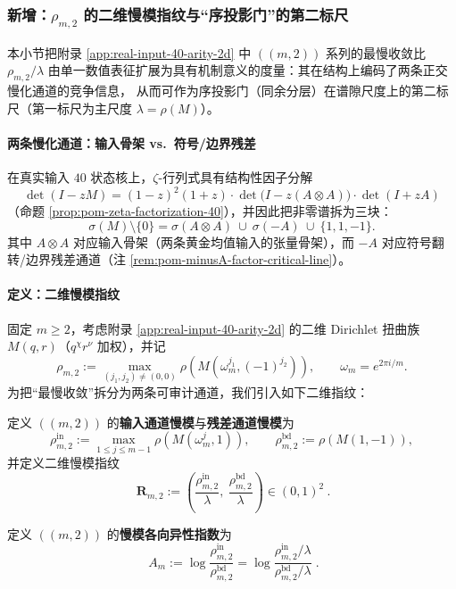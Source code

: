 \subsubsection{新增：\texorpdfstring{$\rho_{m,2}$}{rho(m,2)} 的二维慢模指纹与“序投影门”的第二标尺}\label{subsec:rho-m2-2d-fingerprint}
本小节把附录 \ref{app:real-input-40-arity-2d} 中 \(((m,2))\) 系列的最慢收敛比
\(\rho_{m,2}/\lambda\) 由单一数值表征扩展为具有机制意义的度量：其在结构上编码了两条正交慢化通道的竞争信息，
从而可作为序投影门（同余分层）在谱隙尺度上的第二标尺（第一标尺为主尺度 \(\lambda=\rho(M)\)）。

\paragraph{两条慢化通道：输入骨架 vs.\ 符号/边界残差}
在真实输入 \(40\) 状态核上，\(\zeta\)-行列式具有结构性因子分解
\[
\det(I-zM)=(1-z)^2(1+z)\cdot \det\!\bigl(I-z(A\otimes A)\bigr)\cdot \det(I+zA)
\]
（命题 \ref{prop:pom-zeta-factorization-40}），并因此把非零谱拆为三块：
\[
\sigma(M)\setminus\{0\}=\sigma(A\otimes A)\ \cup\ \sigma(-A)\ \cup\ \{1,1,-1\}.
\]
其中 \(A\otimes A\) 对应输入骨架（两条黄金均值输入的张量骨架），而 \(-A\) 对应符号翻转/边界残差通道（注 \ref{rem:pom-minusA-factor-critical-line}）。

\paragraph{定义：二维慢模指纹}
固定 \(m\ge 2\)，考虑附录 \ref{app:real-input-40-arity-2d} 的二维 Dirichlet 扭曲族 \(M(q,r)\)（\(q^ \chi r^\nu\) 加权），并记
\[
\rho_{m,2}:=\max_{(j_1,j_2)\neq(0,0)}\rho\!\left(M(\omega_m^{j_1},(-1)^{j_2})\right),
\qquad \omega_m=e^{2\pi i/m}.
\]
为把“最慢收敛”拆分为两条可审计通道，我们引入如下二维指纹：
\begin{definition}[二维慢模指纹]\label{def:rho-m2-fingerprint}
定义 \(((m,2))\) 的\textbf{输入通道慢模}与\textbf{残差通道慢模}为
\[
\rho^{\mathrm{in}}_{m,2}:=\max_{1\le j\le m-1}\rho\!\left(M(\omega_m^{j},1)\right),
\qquad
\rho^{\mathrm{bd}}_{m,2}:=\rho\!\left(M(1,-1)\right),
\]
并定义二维慢模指纹
\[
\boxed{\ \mathbf{R}_{m,2}:=\left(\frac{\rho^{\mathrm{in}}_{m,2}}{\lambda},\ \frac{\rho^{\mathrm{bd}}_{m,2}}{\lambda}\right)\in(0,1)^2\ }.
\]
\end{definition}

\begin{definition}\label{def:rho-m2-anisotropy-index}
定义 \(((m,2))\) 的\textbf{慢模各向异性指数}为
\[
\boxed{\;
A_m
:=\log\frac{\rho^{\mathrm{in}}_{m,2}}{\rho^{\mathrm{bd}}_{m,2}}
=\log\frac{\rho^{\mathrm{in}}_{m,2}/\lambda}{\rho^{\mathrm{bd}}_{m,2}/\lambda}\; }.
\]
\end{definition}

